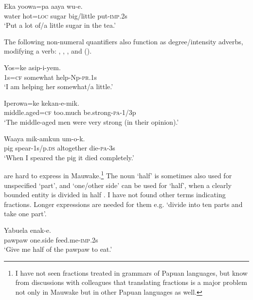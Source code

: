 \ea%
\label{ex:3:x103}
\gll Eka yoowa=pa aaya  wu-e. \\
water hot=\textsc{loc} sugar big/little put-\textsc{imp}.2s\\
\glt`Put a lot of/a little sugar in the tea.'
\z

The following non-numeral quantifiers also function as degree/intensity adverbs, modifying a verb:   ,  ,  , and  ().

\ea%
\label{ex:3:x511}
\gll Yos=ke  asip-i-yem.\\
1s=\textsc{cf} somewhat help-Np-\textsc{pr}.1s\\
\glt`I am helping her somewhat/a little.'
\z

\ea%
\label{ex:3:x512}
\gll Iperowa=ke  kekan-e-mik. \\
middle.aged=\textsc{cf} too.much be.strong-\textsc{pa}-1/3p\\
\glt`The middle-aged men were very strong (in their opinion).'
\z

\ea%
\label{ex:3:x513}
\gll Waaya mik-amkun  um-o-k. \\
pig spear-1s/p.\textsc{ds} altogether die-\textsc{pa}-3s\\
\glt`When I speared the pig it died completely.'
\z

 are hard to express in Mauwake.\footnote{I have not seen fractions treated in grammars of Papuan languages, but know from discussions with colleagues that translating fractions is a major problem not only in Mauwake but in other Papuan languages as well.} The noun  `half' is sometimes also used for unspecified `part', and  `one/other side' can be used for `half', when a clearly bounded entity is divided in half . I have not found other terms indicating fractions. Longer expressions are needed for them e.g. `divide into ten parts and take one part'.

\ea%
\label{ex:3:x104}
\gll Yabuela  enak-e. \\
pawpaw one.side feed.me-\textsc{imp}.2s\\
\glt`Give me half of the pawpaw to eat.'
\z


